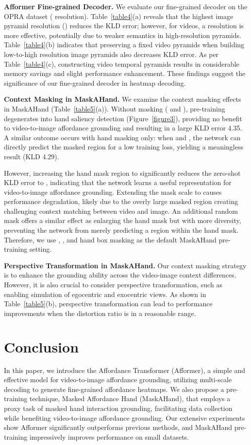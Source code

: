 \documentclass[10pt,twocolumn,letterpaper]{article}
\begin{document}
{\noindent\textbf{Afformer Fine-grained Decoder.} 
We evaluate our fine-grained decoder on the OPRA dataset ( resolution). Table~\ref{table4}(a) reveals that the highest image pyramid resolution () reduces the KLD error; however, for videos, a  resolution is more effective, potentially due to weaker semantics in high-resolution pyramids. Table~\ref{table4}(b) indicates that preserving a fixed video pyramids when building low-to-high resolution image pyramids also decreases KLD error. As per Table~\ref{table4}(c), constructing video temporal pyramids results in considerable memory savings and slight performance enhancement. These findings suggest the significance of our fine-grained decoder in heatmap decoding.

\noindent\textbf{Context Masking in MaskAHand.} 
We examine the context masking effects in MaskAHand (Table~\ref{table5}(a)). Without masking ( and ), pre-training degenerates into hand saliency detection (Figure~\ref{figure3}), providing no benefit to video-to-image affordance grounding and resulting in a large KLD error 4.35. A similar outcome occurs with hand masking only: when  and , the network can directly predict the masked region for a low training loss, yielding a meaningless result (KLD 4.29).

However, increasing the hand mask region to  significantly reduces the zero-shot KLD error to , indicating that the network learns a useful representation for video-to-image affordance grounding. Extending the mask scale to  causes performance degradation, likely due to the overly large masked region creating challenging context matching between video and image. An additional random mask offers a similar effect as enlarging the hand mask but with more diversity, preventing the network from merely predicting a region within the hand mask. Therefore, we use , , and  hand box masking as the default MaskAHand pre-training setting.
 
\noindent\textbf{Perspective Transformation in MaskAHand.} 
Our context masking strategy is to enhance the grounding ability across the video-image context differences. However, it is also crucial to consider perspective transformation, such as enabling simulation of egocentric and exocentric views. As shown in Table~\ref{table5}(b), perspective transformation can lead to performance improvements when the distortion ratio is in a reasonable range.

\section{Conclusion}
In this paper, we introduce the Affordance Transformer (Afformer), a simple and effective model for video-to-image affordance grounding, utilizing multi-scale decoding to generate fine-grained affordance heatmaps. We also propose a pre-training technique, Masked Affordance Hand (MaskAHand), that employs a proxy task of masked hand interaction grounding, facilitating data collection while benefiting video-to-image affordance grounding. Our extensive experiments show Afformer significantly outperforms previous methods, and MaskAHand pre-training impressively improves performance on small datasets.

}
\end{document}

